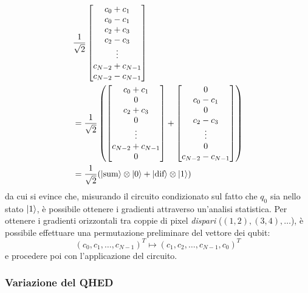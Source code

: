 \begin{align*}
	&\frac{1}{\sqrt 2} \begin{bmatrix}
	c_0+c_1\\ c_0-c_1\\ c_2+c_3\\ c_2-c_3\\ \vdots\\ c_{N-2}+c_{N-1}\\ c_{N-2}-c_{N-1}
\end{bmatrix}\\
	&=\frac{1}{\sqrt 2} 
\left(
\begin{bmatrix}
c_0+c_1\\ 0\\ c_2+c_3\\ 0\\ \vdots\\ c_{N-2}+c_{N-1}\\ 0
\end{bmatrix} + \begin{bmatrix}
0\\ c_0-c_1\\ 0\\ c_2-c_3\\ \vdots\\ 0\\ c_{N-2}-c_{N-1}
\end{bmatrix}
\right)\\
	&=\frac{1}{\sqrt 2} (\lvert\text{sum}\rangle \otimes \lvert0\rangle
		+ \lvert\text{dif}\rangle \otimes \lvert1\rangle)
\end{align*}
da cui si evince che, misurando il circuito condizionato sul fatto che $q_0$ sia nello stato $\lvert1\rangle$, è possibile ottenere i gradienti attraverso un'analisi statistica. Per ottenere i gradienti orizzontali tra coppie di pixel \emph{dispari} ($(1,2), (3,4), \ldots$), è possibile effettuare una permutazione preliminare del vettore dei qubit:
\begin{equation}\label{eq:perm}
	(c_0, c_1, \ldots, c_{N-1})^T \mapsto (c_1, c_2, \ldots, c_{N-1}, c_0)^T
\end{equation}
e procedere poi con l'applicazione del circuito.

\subsubsection*{Variazione del QHED}

